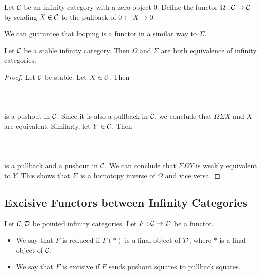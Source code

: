 \begin{defn}\label{ILoop} Let $\mathcal{C}$ be an infinity category with a zero object $0$. Define the functor $\Omega:\mathcal{C}\to\mathcal{C}$ by sending $X\in\mathcal{C}$ to the pullback of $0\leftarrow X\rightarrow0$. 
\end{defn}

We can guarantee that looping is a functor in a similar way to $\Sigma$. 

\begin{prp}\label{prp:SusLoopEquiv} Let $\mathcal{C}$ be a stable infinity category. Then $\Omega$ and $\Sigma$ are both equivalence of infinity categories. 
\begin{proof}
Let $\mathcal{C}$ be stable. Let $X\in\mathcal{C}$. Then  
 \\~\\  \\~\\
is a pushout in $\mathcal{C}$. Since it is also a pullback in $\mathcal{C}$, we conclude that $\Omega\Sigma X$ and $X$ are equivalent. Similarly, let $Y\in\mathcal{C}$. Then  
 \\~\\  \\~\\
is a pullback and a pushout in $\mathcal{C}$. We can conclude that $\Sigma\Omega Y$ is weakly equivalent to $Y$. This shows that $\Sigma$ is a homotopy inverse of $\Omega$ and vice versa. 
\end{proof}
\end{prp}

\subsection{Excisive Functors between Infinity Categories}
\begin{defn}\label{defn:ICExcisive} Let $\mathcal{C},\mathcal{D}$ be pointed infinity categories. Let $F:\mathcal{C}\to\mathcal{D}$ be a functor. 
\begin{itemize}
\item We say that $F$ is reduced if $F(\ast)$ is a final object of $\mathcal{D}$, where $\ast$ is a final object of $\mathcal{C}$. 
\item We say that $F$ is excisive if $F$ sends pushout squares to pullback squares. 
\end{itemize}
\end{defn}

